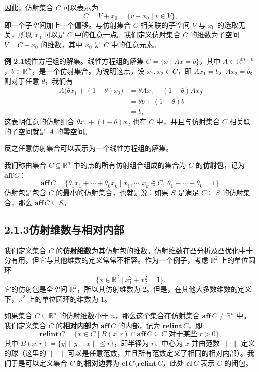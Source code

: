 \documentclass[UTF8,12pt,a4paper,fontset=fandol]{ctexart}
\begin{document}
因此，仿射集合 $C$ 可以表示为
\[
  C=V+x_0=\{v+x_0\mid v\in V\},
\]
即一个子空间加上一个偏移。与仿射集合 $C$ 相关联的子空间 $V$ 与 $x_0$ 的选取无关，所以 $x_0$ 可以是 $C$ 中的任意一点。我们定义仿射集合 $C$ 的维数为子空间 $V=C-x_0$ 的维数，其中 $x_0$ 是 $C$ 中的任意元素。

\noindent\textbf{例 2.1}\quad 线性方程组的解集。线性方程组的解集 $C=\{x\mid Ax=b\}$，其中 $A\in\mathbb{R}^{m\times n}$，$b\in\mathbb{R}^m$，是一个仿射集合。为说明这点，设 $x_1,x_2\in C$，即 $Ax_1=b$，$Ax_2=b$。则对于任意 $\theta$，我们有
\[
\begin{aligned}
  A\bigl(\theta x_1+(1-\theta)x_2\bigr)
  &=\theta Ax_1+(1-\theta)Ax_2\\
  &=\theta b+(1-\theta)b\\
  &=b,
\end{aligned}
\]
这表明任意的仿射组合 $\theta x_1+(1-\theta)x_2$ 也在 $C$ 中，并且与仿射集合 $C$ 相关联的子空间就是 $A$ 的零空间。

反之任意仿射集合可以表示为一个线性方程组的解集。

我们称由集合 $C\subseteq\mathbb{R}^n$ 中的点的所有仿射组合组成的集合为 $C$ 的\textbf{仿射包}，记为 $\mathbf{aff}\,C$：
\[
  \mathbf{aff}\,C=\{\theta_1x_1+\cdots+\theta_kx_k\mid x_1,\cdots,x_k\in C,\ \theta_1+\cdots+\theta_k=1\}.
\]
仿射包是包含 $C$ 的最小的仿射集合，也就是说：如果 $S$ 是满足 $C\subseteq S$ 的仿射集合，那么 $\mathbf{aff}\,C\subseteq S$。

\subsection*{2.1.3\quad 仿射维数与相对内部}

我们定义集合 $C$ 的\textbf{仿射维数}为其仿射包的维数。仿射维数在凸分析及凸优化中十分有用，但它与其他维数的定义常常不相容。作为一个例子，考虑 $\mathbb{R}^2$ 上的单位圆环
\[
  \{x\in\mathbb{R}^2\mid x_1^2+x_2^2=1\}.
\]
它的仿射包是全空间 $\mathbb{R}^2$，所以其仿射维数为 2。但是，在其他大多数维数的定义下，$\mathbb{R}^2$ 上的单位圆环的维数为 1。

如果集合 $C\subseteq\mathbb{R}^n$ 的仿射维数小于 $n$，那么这个集合在仿射集合 $\mathbf{aff}\,C\ne\mathbb{R}^n$ 中。我们定义集合 $C$ 的\textbf{相对内部}为 $\mathbf{aff}\,C$ 的内部，记为 $\mathbf{relint}\,C$，即
\[
  \mathbf{relint}\,C=\{x\in C\mid B(x,r)\cap \mathbf{aff}\,C\subseteq C\text{ 对于某些 }r>0\},
\]
其中 $B(x,r)=\{y\mid \|y-x\|\le r\}$，即半径为 $r$、中心为 $x$ 并由范数 $\|\cdot\|$ 定义的球（这里的 $\|\cdot\|$ 可以是任意范数，并且所有范数定义了相同的相对内部）。我们于是可以定义集合 $C$ 的\textbf{相对边界}为 $\mathbf{cl}\,C\setminus\mathbf{relint}\,C$，此处 $\mathbf{cl}\,C$ 表示 $C$ 的闭包。
\end{document}
